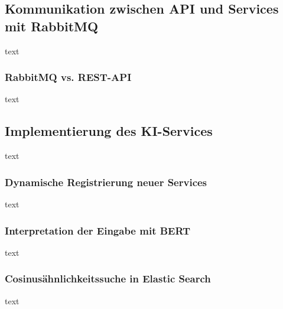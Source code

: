 \subsection{Kommunikation zwischen API und Services mit RabbitMQ}
text
\subsubsection{RabbitMQ vs. REST-API}
text
\subsection{Implementierung des KI-Services}
text
\subsubsection{Dynamische Registrierung neuer Services}
text
\subsubsection{Interpretation der Eingabe mit BERT}
text
\subsubsection{Cosinusähnlichkeitssuche in Elastic Search}
text
